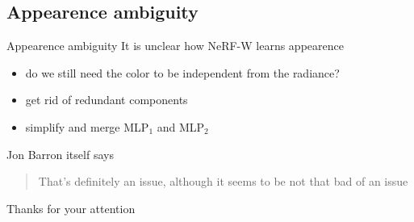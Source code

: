 \documentclass[aspectratio=1610]{beamer}
\begin{document}
\subsection{Appearence ambiguity}
\begin{frame}{Appearence ambiguity}
    It is unclear how NeRF-W learns appearence
    \bigskip
    \begin{itemize}
        \item do we still need the color to be independent from the radiance?
        \item get rid of redundant components
        \item simplify and merge MLP\(_1\) and MLP\(_2\)
    \end{itemize}
    \bigskip
    \begin{exampleblock}{Jon Barron itself says}
        \begin{quote}
            That's definitely an issue, although it seems to be not that bad of an issue
          \end{quote}
    \end{exampleblock}
\end{frame}

\begin{frame}
    \begin{center}
        Thanks for your attention
    \end{center}
\end{frame}
\end{document}
